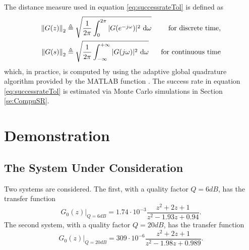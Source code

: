 The distance measure used in equation \eqref{eq:successrateTol} is defined as
\begin{align}
\norm[2]{G(z)} &\isdef \sqrt{\frac{1}{2\pi}\int_0^{2\pi} |G(e^{-j\omega})|^2\ \mathrm{d}\omega}& \text{ for discrete time,}\\
\norm[2]{G(s)} &\isdef \sqrt{\frac{1}{2\pi}\int_{-\infty}^{+\infty} |G(j\omega)|^2\ \mathrm{d}\omega}& \text{ for continuous time}
\end{align}
 which, in practice, is computed by using the adaptive global quadrature algorithm provided by the MATLAB function .
The success rate in equation \eqref{eq:successrateTol} is estimated via Monte Carlo simulations in  Section \ref{se:CompuSR}.



\section{Demonstration}\label{se:Demo}

\subsection{The System Under Consideration}

Two systems are considered. The first, with a quality factor $Q = 6\unit{dB}$, has the transfer function
  \begin{equation}
     G_0(z) \Big|_{Q=6\unit{dB}}
    = 1.74 \cdot 10^{-3}
    \frac{ z^2 + 2 z + 1 }
         { z^2 - 1.93 z + 0.94}
    \label{eq:systemundertest}
    \text{.}
  \end{equation}
The second system, with a quality factor $Q = 20\unit{dB}$, has the transfer function
  \begin{equation}
    G_0(z) \Big|_{Q=20\unit{dB}}
    = 309 \cdot 10^{-6}
            \frac{z^2 + 2 z + 1}
                 {z^2 - 1.98 z + 0.989}
    \label{eq:systundertest-20dB}
    \text{.}
  \end{equation}

